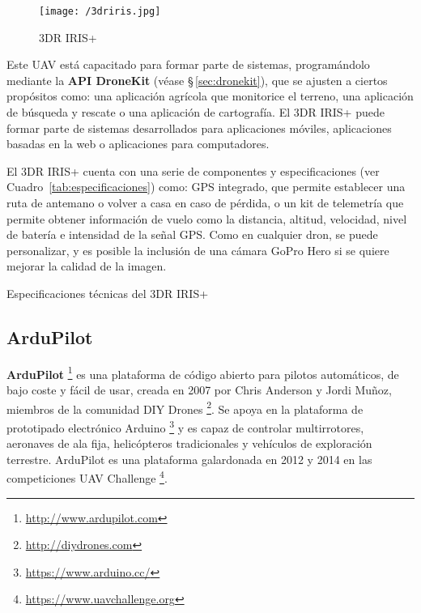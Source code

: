 \begin{figure}[!h]
\begin{center}
\texttt{[image: /3driris.jpg]}
\caption[3DR IRIS+]{3DR IRIS+}
\label{fig:3dririsplus}
\end{center}
\end{figure}

Este \acs{UAV} está capacitado para formar parte de sistemas, programándolo mediante la \textbf{\acs{API} DroneKit} (véase \S\,\ref{sec:dronekit}), que se ajusten a ciertos propósitos como: una aplicación agrícola que monitorice el terreno, una aplicación de búsqueda y rescate o una aplicación de cartografía. El 3DR IRIS+ puede formar parte de sistemas desarrollados para aplicaciones móviles, aplicaciones basadas en la web o aplicaciones para computadores.

El 3DR IRIS+ cuenta con una serie de componentes y especificaciones (ver Cuadro~\ref{tab:especificaciones}) como: GPS integrado, que permite establecer una ruta de antemano o volver a casa en caso de pérdida, o un kit de telemetría que permite obtener información de vuelo como la distancia, altitud, velocidad, nivel de batería e intensidad de la señal \acs{GPS}. Como en cualquier dron, se puede personalizar, y es posible la inclusión de una cámara GoPro Hero si se quiere mejorar la calidad de la imagen.

\begin{table}[!h]
 \centering
 {\small
 
 }
 \caption[Especificaciones técnicas del 3DR IRIS+]
 {Especificaciones técnicas del 3DR IRIS+ \cite{especifaciones3dr}}
 \label{tab:especificaciones}
\end{table}

\subsection{ArduPilot}
\label{sec:ardupilot}

\textbf{ArduPilot} \footnote{\url{http://www.ardupilot.com}} es una plataforma de código abierto para pilotos automáticos, de bajo coste y fácil de usar, creada en 2007 por Chris Anderson y Jordi Muñoz, miembros de la comunidad DIY Drones \footnote{\url{http://diydrones.com}}. Se apoya en la plataforma de prototipado electrónico Arduino \footnote{\url{https://www.arduino.cc/}} y es capaz de controlar multirrotores, aeronaves de ala fija, helicópteros tradicionales y vehículos de exploración terrestre. ArduPilot es una plataforma galardonada en 2012 y 2014 en las competiciones UAV Challenge \footnote{\url{https://www.uavchallenge.org}}.

